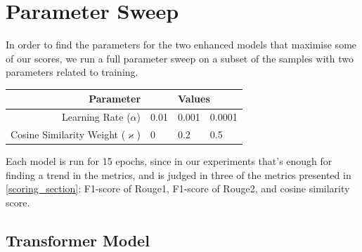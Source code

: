 \section{Parameter Sweep}
\label{param_sweep_section}

In order to find the parameters for the two enhanced models that maximise some of our scores, we run a full parameter sweep on a subset of the samples with two parameters related to training.
\begin{table}[h]
	\centering
	\begin{tabular}{r | l l l}
		\toprule
			Parameter & \multicolumn{3}{|c}{Values} \\
		\midrule
			Learning Rate ($\alpha$) & 0.01 & 0.001 & 0.0001 \\
			Cosine Similarity Weight ($\varkappa$) & 0 & 0.2 & 0.5 \\
		\bottomrule
	\end{tabular}
\end{table}

Each model is run for 15 epochs, since in our experiments that's enough for finding a trend in the metrics, and is judged in three of the metrics presented in \cref{scoring_section}: F1-score of Rouge1, F1-score of Rouge2, and cosine similarity score.

\subsection{Transformer Model}

